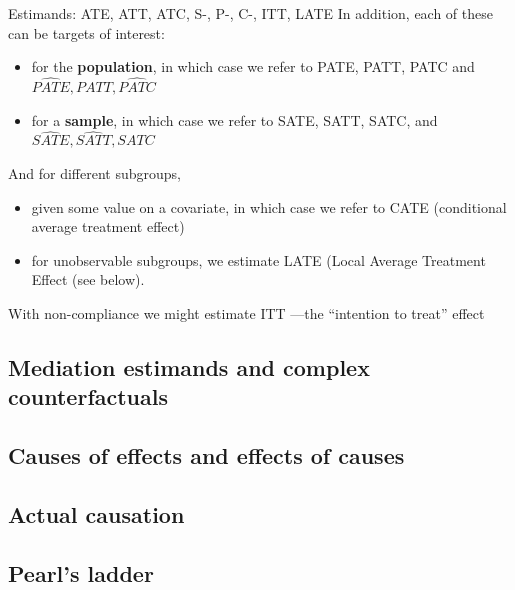 \documentclass[
  11pt,
  ignorenonframetext,
]{beamer}
\providecommand{\tightlist}{%
  \setlength{\itemsep}{0pt}\setlength{\parskip}{0pt}}\usepackage{longtable,booktabs,array}
\begin{document}
\begin{frame}{Estimands: ATE, ATT, ATC, S-, P-, C-, ITT, LATE}
\protect\hypertarget{estimands-ate-att-atc-s--p--c--itt-late-1}{}
In addition, each of these can be targets of interest:

\begin{itemize}
\tightlist
\item
  for the \textbf{population}, in which case we refer to PATE, PATT,
  PATC and \(\widehat{PATE}, \widehat{PATT}, \widehat{PATC}\)
\item
  for a \textbf{sample}, in which case we refer to SATE, SATT, SATC, and
  \(\widehat{SATE}, \widehat{SATT}, \widehat{SATC}\)
\end{itemize}

And for different subgroups,

\begin{itemize}
\tightlist
\item
  given some value on a covariate, in which case we refer to CATE
  (conditional average treatment effect)
\item
  for unobservable subgroups, we estimate LATE (Local Average Treatment
  Effect (see below).
\end{itemize}

With non-compliance we might estimate ITT ---the ``intention to treat''
effect
\end{frame}

\hypertarget{mediation-estimands-and-complex-counterfactuals}{%
\subsection{Mediation estimands and complex
counterfactuals}\label{mediation-estimands-and-complex-counterfactuals}}

\hypertarget{causes-of-effects-and-effects-of-causes}{%
\subsection{Causes of effects and effects of
causes}\label{causes-of-effects-and-effects-of-causes}}

\hypertarget{actual-causation}{%
\subsection{Actual causation}\label{actual-causation}}

\hypertarget{pearls-ladder}{%
\subsection{Pearl's ladder}\label{pearls-ladder}}
\end{document}
